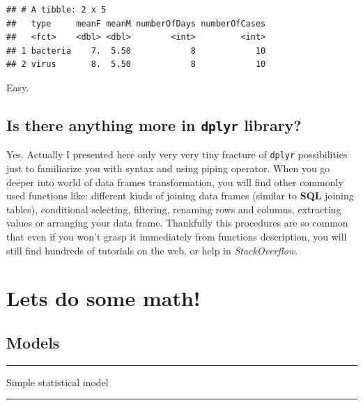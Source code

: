 \documentclass[]{book}
\theoremstyle{definition}
\theoremstyle{definition}
\theoremstyle{definition}
\theoremstyle{remark}
\begin{document}
\begin{verbatim}
## # A tibble: 2 x 5
##   type     meanF meanM numberOfDays numberOfCases
##   <fct>    <dbl> <dbl>        <int>         <int>
## 1 bacteria    7.  5.50            8            10
## 2 virus       8.  5.50            8            10
\end{verbatim}

Easy.

\section{\texorpdfstring{Is there anything more in \texttt{dplyr}
library?}{Is there anything more in dplyr library?}}\label{is-there-anything-more-in-dplyr-library}

Yes. Actually I presented here only very very tiny fracture of
\texttt{dplyr} possibilities just to familiarize you with syntax and
using piping operator. When you go deeper into world of data frames
transformation, you will find other commonly used functions like:
different kinds of joining data frames (similar to \textbf{SQL} joining
tables), conditional selecting, filtering, renaming rows and columns,
extracting values or arranging your data frame. Thankfully this
procedures are so common that even if you won't grasp it immediately
from functions description, you will still find hundreds of tutorials on
the web, or help in \emph{StackOverflow}.

\chapter{Lets do some math!}\label{lets-do-some-math}

\section{Models}\label{models}

\begin{center}\rule{0.5\linewidth}{\linethickness}\end{center}

\begin{center}
\begingroup\Large
Simple statistical model  
\endgroup
\end{center}

\begin{center}\rule{0.5\linewidth}{\linethickness}\end{center}
\end{document}
